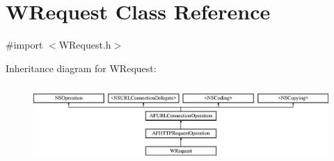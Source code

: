 \hypertarget{interface_w_request}{\section{W\-Request Class Reference}
\label{interface_w_request}
}


{\ttfamily \#import $<$W\-Request.\-h$>$}

Inheritance diagram for W\-Request\-:\begin{figure}[H]
\begin{center}
\leavevmode
\includegraphics[height=2.978724cm]{interface_w_request}
\end{center}
\end{figure}
